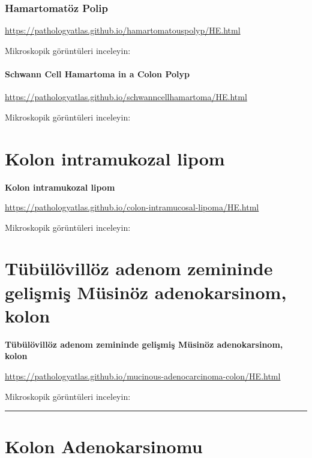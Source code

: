 \documentclass[
  letterpaper,
  DIV=11,
  numbers=noendperiod]{scrreprt}
\begin{document}
\hypertarget{hamartomatuxf6z-polip-1}{%
\subsection{Hamartomatöz Polip}\label{hamartomatuxf6z-polip-1}}

\url{https://pathologyatlas.github.io/hamartomatouspolyp/HE.html}

Mikroskopik görüntüleri inceleyin:

\hypertarget{schwann-cell-hamartoma-in-a-colon-polyp-1}{%
\subsubsection{Schwann Cell Hamartoma in a Colon
Polyp}\label{schwann-cell-hamartoma-in-a-colon-polyp-1}}

\url{https://pathologyatlas.github.io/schwanncellhamartoma/HE.html}

Mikroskopik görüntüleri inceleyin:

\hypertarget{kolon-intramukozal-lipom}{%
\chapter{Kolon intramukozal lipom}\label{kolon-intramukozal-lipom}}

\textbf{Kolon intramukozal lipom}

\url{https://pathologyatlas.github.io/colon-intramucosal-lipoma/HE.html}

Mikroskopik görüntüleri inceleyin:

\hypertarget{tuxfcbuxfcluxf6villuxf6z-adenom-zemininde-geliux15fmiux15f-muxfcsinuxf6z-adenokarsinom-kolon}{%
\chapter{Tübülövillöz adenom zemininde gelişmiş Müsinöz adenokarsinom,
kolon}\label{tuxfcbuxfcluxf6villuxf6z-adenom-zemininde-geliux15fmiux15f-muxfcsinuxf6z-adenokarsinom-kolon}}

\textbf{Tübülövillöz adenom zemininde gelişmiş Müsinöz adenokarsinom,
kolon}

\url{https://pathologyatlas.github.io/mucinous-adenocarcinoma-colon/HE.html}

Mikroskopik görüntüleri inceleyin:

\begin{center}\rule{0.5\linewidth}{0.5pt}\end{center}

\hypertarget{kolon-adenokarsinomu}{%
\chapter{Kolon Adenokarsinomu}\label{kolon-adenokarsinomu}}
\end{document}
